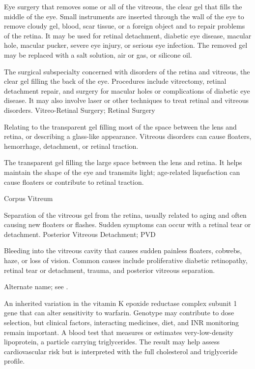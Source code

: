  Eye surgery that removes some or all of the vitreous, the clear gel that fills the middle of the eye. Small instruments are inserted through the wall of the eye to remove cloudy gel, blood, scar tissue, or a foreign object and to repair problems of the retina. It may be used for retinal detachment, diabetic eye disease, macular hole, macular pucker, severe eye injury, or serious eye infection. The removed gel may be replaced with a salt solution, air or gas, or silicone oil.

 The surgical subspecialty concerned with disorders of the retina and vitreous,
the clear gel filling the back of the eye. Procedures include vitrectomy, retinal detachment
repair, and surgery for macular holes or complications of diabetic eye disease. It may also
involve laser or other techniques to treat retinal and vitreous disorders.
\synonyms
Vitreo-Retinal Surgery; Retinal Surgery

 Relating to the transparent gel filling most of the space between the lens and retina, or describing a glass-like appearance. Vitreous disorders can cause floaters, hemorrhage, detachment, or retinal traction.

 The transparent gel filling the large space between the lens and retina. It helps maintain the shape of the eye and transmits light; age-related liquefaction can cause floaters or contribute to retinal traction.

\synonyms
Corpus Vitreum

 Separation of the vitreous gel from the retina, usually related to aging and often causing new floaters or flashes. Sudden symptoms can occur with a retinal tear or detachment.
\synonyms
Posterior Vitreous Detachment; PVD

 Bleeding into the vitreous cavity that causes sudden painless floaters, cobwebs, haze,
or loss of vision. Common causes include proliferative diabetic retinopathy, retinal
tear or detachment, trauma, and posterior vitreous separation.

 Alternate name; see .

 An inherited variation in the vitamin K epoxide reductase complex subunit 1 gene that can alter sensitivity to warfarin. Genotype may contribute to dose selection, but clinical factors, interacting medicines, diet, and INR monitoring remain important.
 A blood test that measures or estimates very-low-density lipoprotein, a particle carrying triglycerides. The result may help assess cardiovascular risk but is interpreted with the full cholesterol and triglyceride profile.

